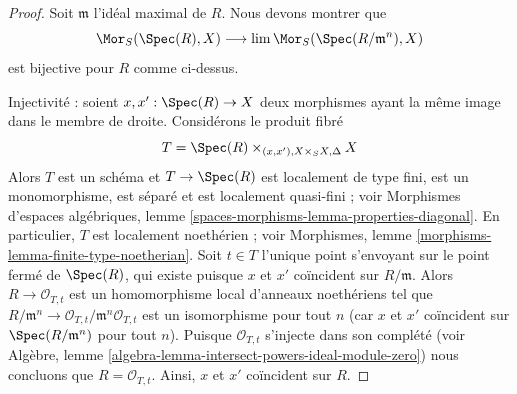 \begin{proof}
Soit $\mathfrak m$ l'idéal maximal de $R$. Nous devons montrer que
$$
\Mor_S(\Spec(R), X) \longrightarrow \lim \Mor_S(\Spec(R/\mathfrak m^n), X)
$$
est bijective pour $R$ comme ci-dessus.

\medskip\noindent
Injectivité : soient $x, x' : \Spec(R) \to X$
deux morphismes ayant la même image dans le membre de droite.
Considérons le produit fibré
$$
T = \Spec(R) \times_{(x, x'), X \times_S X, \Delta} X
$$
Alors $T$ est un schéma et $T \to \Spec(R)$ est localement de type fini,
est un monomorphisme, est séparé et est localement quasi-fini ; voir
Morphismes d'espaces algébriques, lemme \ref{spaces-morphisms-lemma-properties-diagonal}.
En particulier, $T$ est localement noethérien ; voir
Morphismes, lemme \ref{morphisms-lemma-finite-type-noetherian}.
Soit $t \in T$ l'unique point s'envoyant sur le point fermé de $\Spec(R)$,
qui existe puisque $x$ et $x'$ coïncident sur $R/\mathfrak m$. Alors
$R \to \mathcal{O}_{T, t}$ est un homomorphisme local d'anneaux noethériens tel que
$R/\mathfrak m^n \to \mathcal{O}_{T, t}/\mathfrak m^n\mathcal{O}_{T, t}$
est un isomorphisme pour tout $n$ (car $x$ et $x'$ coïncident sur
$\Spec(R/\mathfrak m^n)$ pour tout $n$). Puisque $\mathcal{O}_{T, t}$
s'injecte dans son complété (voir
Algèbre, lemme \ref{algebra-lemma-intersect-powers-ideal-module-zero})
nous concluons que $R = \mathcal{O}_{T, t}$. Ainsi, $x$ et $x'$ coïncident
sur $R$.


\end{proof}
